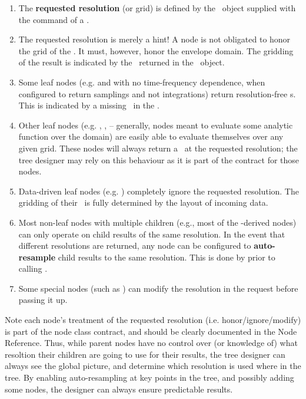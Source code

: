   \begin{enumerate}
  
  \item The {\bf requested resolution} (or grid) is defined by the \Cells\
  object supplied with the  command of a \Request.

  \item The requested resolution is merely a hint! A node is not obligated to
  honor the grid of the \Cells. It must, however, honor the envelope domain.
  The gridding of the result is indicated by the \Cells\ returned in the
  \Result\ object.
  
  \item Some leaf nodes (e.g.  and  with no time-frequency
  dependence, when configured to return samplings and not integrations) return
  resolution-free \Result{}s. This is indicated by a missing \Cells\ in the
  \Result. 

  \item Other leaf nodes (e.g. , ,  -- generally,
  nodes meant to evaluate some analytic function over the domain) are easily
  able to evaluate themselves over any given grid. These nodes will always
  return a \Result\ at the requested resolution; the tree designer may rely on
  this behaviour as it is part of the contract for those nodes.

  \item Data-driven leaf nodes (e.g. ) completely ignore the
  requested resolution. The gridding of their \Result\ is fully determined by
  the layout of incoming data.

  \item Most non-leaf nodes with multiple children (e.g., most of the
  \qq{Function}-derived nodes) can only operate on child results of the same
  resolution. In the event that different resolutions are returned, any node
  can be configured to {\bf auto-resample} child results to the same
  resolution. This is done by \qq{Node::execute()} prior to calling
  \qq{getResult()}.

  \item Some special nodes (such as ) can modify the resolution in
  the request before passing it up.
  
  \end{enumerate}
  
  Note each node's treatment of the requested resolution (i.e.
  honor/ignore/modify) is part of the node class contract, and should be
  clearly documented in the Node Reference. Thus, while parent nodes have no
  control over (or knowledge of) what resoltion their children are going to use
  for their results, the tree designer can always see the global picture, and
  determine which resolution is used where in the tree. By enabling
  auto-resampling at key points in the tree, and possibly adding some
  \qq{ModRes} nodes, the designer can always ensure predictable results.

